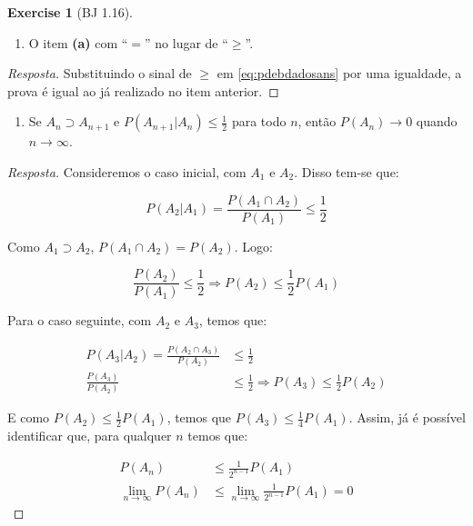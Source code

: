 \documentclass[
]{article}
\providecommand{\tightlist}{%
  \setlength{\itemsep}{0pt}\setlength{\parskip}{0pt}}
\theoremstyle{definition}
\theoremstyle{definition}
\theoremstyle{definition}
\newtheorem{exercise}{Exercise}[section]
\theoremstyle{definition}
\theoremstyle{remark}
\begin{document}
\begin{exercise}[BJ 1.16]
\begin{enumerate}
\def\labelenumi{\alph{enumi})}
\setcounter{enumi}{1}
\tightlist
\item
  O item \textbf{(a)} com ``\(=\)'' no lugar de ``\(\ge\)''.
\end{enumerate}

\begin{proof}[Resposta]
Substituindo o sinal de \(\ge\) em \eqref{eq:pdebdadosans} por uma igualdade, a prova é igual ao já realizado no item anterior.
\end{proof}

\begin{enumerate}
\def\labelenumi{\alph{enumi})}
\setcounter{enumi}{2}
\tightlist
\item
  Se \(A_{n} \supset A_{n+1}\) e \(P(A_{n+1}|A_{n}) \le \frac{1}{2}\) para todo \(n\), então \(P(A_{n}) \to 0\) quando \(n \to \infty\).
\end{enumerate}

\begin{proof}[Resposta]
Consideremos o caso inicial, com \(A_{1}\) e \(A_{2}\). Disso tem-se que:

\begin{equation*}
P(A_{2}|A_{1}) = \frac{P(A_{1} \cap A_{2})}{P(A_{1})} \le \frac{1}{2}
\end{equation*}

Como \(A_{1} \supset A_{2}\), \(P(A_{1} \cap A_{2}) = P(A_{2})\). Logo:

\begin{equation*}
\frac{P(A_{2})}{P(A_{1})} \le \frac{1}{2} \Rightarrow P(A_{2}) \le \frac{1}{2}P(A_{1})
\end{equation*}

Para o caso seguinte, com \(A_{2}\) e \(A_{3}\), temos que:

\begin{align*}
P(A_{3}|A_{2}) = \frac{P(A_{2} \cap A_{3})}{P(A_{2})} &\le \frac{1}{2} \\
\frac{P(A_{3})}{P(A_{2})} &\le \frac{1}{2} \Rightarrow P(A_{3}) \le \frac{1}{2}P(A_{2})
\end{align*}

E como \(P(A_{2}) \le \frac{1}{2}P(A_{1})\), temos que \(P(A_{3}) \le \frac{1}{4}P(A_{1})\). Assim, já é possível identificar que, para qualquer \(n\) temos que:

\begin{align*}
P(A_{n}) &\le \frac{1}{2^{n-1}}P(A_{1}) \\
\lim_{n \to \infty}P(A_{n}) &\le \lim_{n \to \infty}\frac{1}{2^{n-1}}P(A_{1}) = 0
\end{align*}


\end{proof}
\end{exercise}
\end{document}
